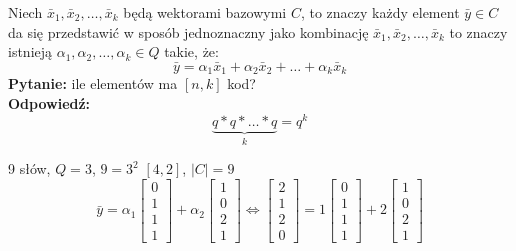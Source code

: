 \begin{definition}
Niech $\bar{x}_1,\bar{x}_2,\dots ,\bar{x}_k$ będą wektorami bazowymi $C$, to znaczy każdy element $\bar{y}\in C$ da się przedstawić w sposób jednoznaczny jako kombinację $\bar{x}_1,\bar{x}_2,\dots ,\bar{x}_k$ to znaczy istnieją $\alpha _1,\alpha _2,\dots ,\alpha _k \in Q$ takie, że:
$$\bar{y}=\alpha _1\bar{x}_1+\alpha _2\bar{x}_2+\dots +\alpha _k\bar{x}_k$$
\textbf{Pytanie:} ile elementów ma $[n,k]$ kod?\\
\textbf{Odpowiedź:} $$\underbrace{q*q*\dots *q}_k=q^k$$
\end{definition}
\begin{example*}
9 słów, $Q=3$, $9=3^2$ $[4,2]$, $|C|=9$
$$\bar{y}=\alpha _1\begin{bmatrix}
0\\1\\1\\1
\end{bmatrix}+\alpha _2\begin{bmatrix}
1\\0\\2\\1
\end{bmatrix}\Leftrightarrow \begin{bmatrix}
2\\1\\2\\0
\end{bmatrix}=1\begin{bmatrix}
0\\1\\1\\1
\end{bmatrix}+2\begin{bmatrix}
1\\0\\2\\1
\end{bmatrix}$$
\end{example*}

